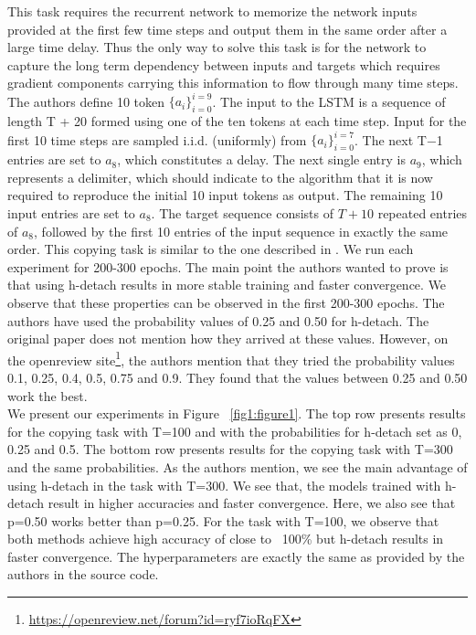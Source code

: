 This task requires the recurrent network to memorize the network inputs provided at the first few
time steps and output them in the same order after a large time delay.  Thus the only way to solve
this task is for the network to capture the long term dependency between inputs and targets which
requires gradient components carrying this information to flow through many time steps.
The authors define 10 token $\{a_i\}^{i=9}_{i=0}$. The input to the LSTM is a sequence of length T + 20 formed using one of the ten tokens at each time step. Input for the first 10 time steps are sampled i.i.d. (uniformly) from $\{a_i\}^{i=7}_{i=0}$. The next T−1 entries are set to $a_8$, which constitutes a delay. The next single entry is $a_9$,  which represents a delimiter,  which should indicate to the algorithm that it is now required to reproduce the initial 10 input tokens as output. The remaining 10 input entries are set to $a_8$.  The target sequence consists of $T+ 10$ repeated entries of $a_8$, followed by the first 10 entries of the input sequence in exactly the same order. This copying task is similar to the one described in \cite{DBLP:journals/corr/ArjovskySB15}.
We run each experiment for 200-300 epochs. The main point the authors wanted to prove is that using h-detach results in more stable training and faster convergence. We observe that these properties can be observed in the first 200-300 epochs. The authors have used the probability values of 0.25 and 0.50 for h-detach. The original paper does not mention how they arrived at these values. However, on the openreview site\footnote{\url{https://openreview.net/forum?id=ryf7ioRqFX}}, the authors mention that they tried the probability values 0.1, 0.25, 0.4, 0.5, 0.75 and 0.9. They found that the values between 0.25 and 0.50 work the best. \\

We present our experiments in Figure ~\ref{fig1:figure1}. The top row presents results for the copying task with T=100 and with the probabilities for h-detach set as 0, 0.25 and 0.5. The bottom row presents results for the copying task with T=300 and the same probabilities. As the authors mention, we see the main advantage of using h-detach in the task with T=300. We see that, the models trained with h-detach result in higher accuracies and faster convergence. Here, we also see that p=0.50 works better than p=0.25. For the task with T=100, we observe that both methods achieve high accuracy of close to ~100\% but h-detach results in faster convergence. The hyperparameters are exactly the same as  provided by the authors in the source code.


